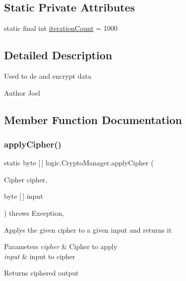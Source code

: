 \subsection*{Static Private Attributes}
\begin{DoxyCompactItemize}
\item 
static final int \mbox{\hyperlink{classlogic_1_1_crypto_manager_a286c951ffc4dfc987e7ea8c23338fd07}{iteration\+Count}} = 1000
\end{DoxyCompactItemize}


\subsection{Detailed Description}
Used to de and encrypt data \begin{DoxyAuthor}{Author}
Joel 
\end{DoxyAuthor}


\subsection{Member Function Documentation}
\mbox{\label{classlogic_1_1_crypto_manager_acd250bd4f2301a12c018ad2bfb5f9831}} 
\subsubsection{\texorpdfstring{apply\+Cipher()}{applyCipher()}}
{\footnotesize\ttfamily static byte \mbox{[}$\,$\mbox{]} logic.\+Crypto\+Manager.\+apply\+Cipher (\begin{DoxyParamCaption}\item[{Cipher}]{cipher,  }\item[{byte \mbox{[}$\,$\mbox{]}}]{input }\end{DoxyParamCaption}) throws Exception\hspace{0.3cm}{\ttfamily [static]}, {\ttfamily [private]}}

Applys the given cipher to a given input and returns it 
\begin{DoxyParams}{Parameters}
{\em cipher} & Cipher to apply \\
\hline
{\em input} & input to cipher \\
\hline
\end{DoxyParams}
\begin{DoxyReturn}{Returns}
ciphered output 
\end{DoxyReturn}

